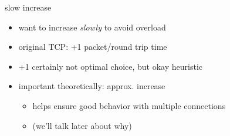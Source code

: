 \begin{frame}{slow increase}
    \begin{itemize}
    \item want to increase \textit{slowly} to avoid overload
    \item original TCP: +1 packet/round trip time
    \vspace{.5cm}
    \item<2-> +1 certainly not optimal choice, but okay heuristic
    \item<2-> important theoretically: approx.  increase
        \begin{itemize}
        \item helps ensure good behavior with multiple connections
        \item (we'll talk later about why)
        \end{itemize}
    \end{itemize}
\end{frame}
